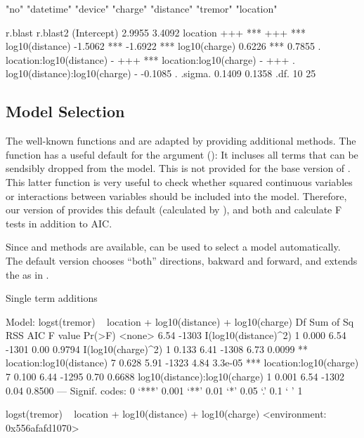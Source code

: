 \documentclass[11pt]{article}
\begin{document}
\begin{Schunk}
\begin{Soutput}
[1] "no"       "datetime" "device"   "charge"   "distance" "tremor"   "location"
\end{Soutput}
\begin{Soutput}
                               r.blast       r.blast2    
(Intercept)                     2.9955        3.4092     
location                          +++   ***     +++   ***
log10(distance)                -1.5062  ***  -1.6922  ***
log10(charge)                   0.6226  ***   0.7855  .  
location:log10(distance)           -            +++   ***
location:log10(charge)             -            +++   .  
log10(distance):log10(charge)      -         -0.1085  .  
.sigma.                         0.1409        0.1358     
.df.                              10            25       
\end{Soutput}
\end{Schunk}

\subsection{Model Selection}
The well-known functions  and  are adapted by 
providing additional methods. 
The function  has a useful default for the argument ():
It incluses all terms that can be sendsibly dropped from the model.
This is not provided for the base version of . 
This latter function is very useful to check whether squared continuous
variables or interactions between variables should be included into the
model. Therefore, our version of  provides this default 
(calculated by ),
and both  and  calculate F tests in addition to AIC.

Since  and  methods are available,  can be used to
select a model automatically. The default  version chooses ``both''
directions, bakward and forward, and extends the  as in .

\begin{Schunk}
\begin{Soutput}
Single term additions

Model:
logst(tremor) ~ location + log10(distance) + log10(charge)
                              Df Sum of Sq  RSS   AIC F value  Pr(>F)    
<none>                                     6.54 -1303                    
I(log10(distance)^2)           1     0.000 6.54 -1301    0.00  0.9794    
I(log10(charge)^2)             1     0.133 6.41 -1308    6.73  0.0099 ** 
location:log10(distance)       7     0.628 5.91 -1323    4.84 3.3e-05 ***
location:log10(charge)         7     0.100 6.44 -1295    0.70  0.6688    
log10(distance):log10(charge)  1     0.001 6.54 -1302    0.04  0.8500    
---
Signif. codes:  0 ‘***’ 0.001 ‘**’ 0.01 ‘*’ 0.05 ‘.’ 0.1 ‘ ’ 1
\end{Soutput}
\begin{Soutput}
logst(tremor) ~ location + log10(distance) + log10(charge)
<environment: 0x556afafd1070>
\end{Soutput}
\end{Schunk}
\end{document}
